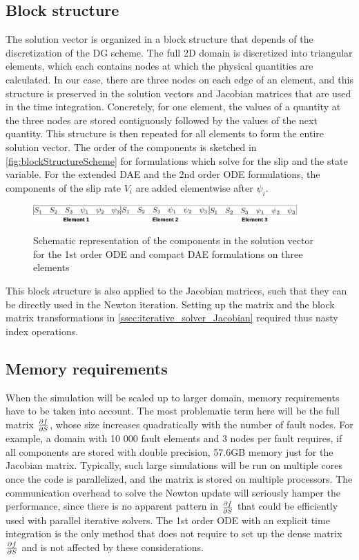 \subsection{Block structure}
The solution vector is organized in a block structure that depends of the discretization of the DG scheme. The full 2D domain is discretized into triangular elements, which each contains nodes at which the physical quantities are calculated. In our case, there are three nodes on each edge of an element, and this structure is preserved in the solution vectors and Jacobian matrices that are used in the time integration. Concretely, for one element, the values of a quantity at the three nodes are stored contiguously followed by the values of the next quantity. This structure is then repeated for all elements to form the entire solution vector. The order of the components is sketched in \autoref{fig:blockStructureScheme} for formulations which solve for the slip and the state variable. For the extended DAE and the 2nd order ODE formulations, the components of the slip rate $V_i$ are added elementwise after $\psi_i$.

\begin{figure}[H]
	\centering
	\includegraphics[width=0.9\textwidth]{images/blockStructure.png}
	\label{fig:blockStructureScheme}
	\caption{Schematic representation of the components in the solution vector for the 1st order ODE and compact DAE formulations on three elements}
\end{figure}

This block structure is also applied to the Jacobian matrices, such that they can be directly used in the Newton iteration. Setting up the matrix and the block matrix transformations in \autoref{ssec:iterative_solver_Jacobian} required thus nasty index operations.

\subsection{Memory requirements}
When the simulation will be scaled up to larger domain, memory requirements have to be taken into account. The most problematic term here will be the full matrix $\pdv{f}{S}$, whose size increases quadratically with the number of fault nodes. For example, a domain with 10 000 fault elements and 3 nodes per fault requires, if all components are stored with double precision, 57.6GB memory just for the Jacobian matrix. Typically, such large simulations will be run on multiple cores once the code is parallelized, and the matrix is stored on multiple processors. The communication overhead to solve the Newton update will seriously hamper the performance, since there is no apparent pattern in $\pdv{f}{S}$ that could be efficiently used with parallel iterative solvers. The 1st order ODE with an explicit time integration is the only method that does not require to set up the dense matrix $\pdv{f}{S}$ and is not affected by these considerations. 


